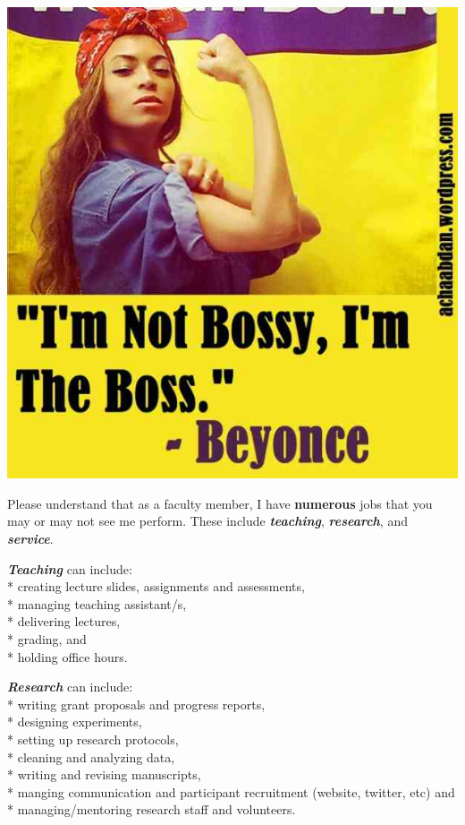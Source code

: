 \documentclass[
]{book}
\begin{document}
\includegraphics{images/boss.jpg}

Please understand that as a faculty member, I have \textbf{numerous} jobs that you may or may not see me perform. These include \textbf{\emph{teaching}}, \textbf{\emph{research}}, and \textbf{\emph{service}}.

\textbf{\emph{Teaching}} can include:\\
* creating lecture slides, assignments and assessments,\\
* managing teaching assistant/s,\\
* delivering lectures,\\
* grading, and\\
* holding office hours.

\textbf{\emph{Research}} can include:\\
* writing grant proposals and progress reports,\\
* designing experiments,\\
* setting up research protocols,\\
* cleaning and analyzing data,\\
* writing and revising manuscripts,\\
* manging communication and participant recruitment (website, twitter, etc) and\\
* managing/mentoring research staff and volunteers.
\end{document}
